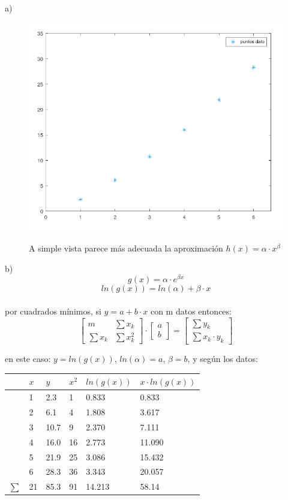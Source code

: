 \documentclass{article}
\begin{document}
a)

\begin{figure}[H]
    \centering
    \includegraphics[width=0.7\linewidth]{ej1_datos.png}
    \label{fig:enter-label}
    \caption{A simple vista parece más adecuada la aproximación $h(x) = \alpha \cdot x^{\beta}$}
\end{figure}

b)\\

\[
g(x) = \alpha \cdot e^{\beta x}
\]
\[
ln(g(x)) = ln(\alpha) + \beta \cdot x
\]\\

por cuadrados mínimos, si $y = a + b \cdot x$ con m datos entonces:
\vspace{0.5cm}
\[
\begin{bmatrix}
    m & \sum{x_k} \\
    \sum{x_k} & \sum{x_k^2}
\end{bmatrix}
\cdot
\begin{bmatrix}
    a \\ b
\end{bmatrix}
=
\begin{bmatrix}
    \sum{y_k} \\
    \sum{x_k \cdot y_k}
\end{bmatrix}
\]

en este caso: $y = ln(g(x))$, $ln(\alpha) = a$, $\beta = b$, y según los datos:
\begin{table}[H]
\centering
\begin{tabular}{|l|l|l|l|l|l|}
\hline
  & $x$  & $y$ & $x^2$ & $ln(g(x))$  & $x \cdot ln(g(x))$ \\ \hline
  & 1  & 2.3  & 1                    & 0.833  & 0.833   \\
  & 2  & 6.1  & 4                    & 1.808  & 3.617   \\
  & 3  & 10.7 & 9                    & 2.370  & 7.111   \\
  & 4  & 16.0 & 16                   & 2.773  & 11.090  \\
  & 5  & 21.9 & 25                   & 3.086  & 15.432  \\
  & 6  & 28.3 & 36                   & 3.343  & 20.057  \\ \hline
$\sum$ & 21 & 85.3 & 91                   & 14.213 & 58.14   \\ \hline
\end{tabular}
\end{table}
\end{document}
